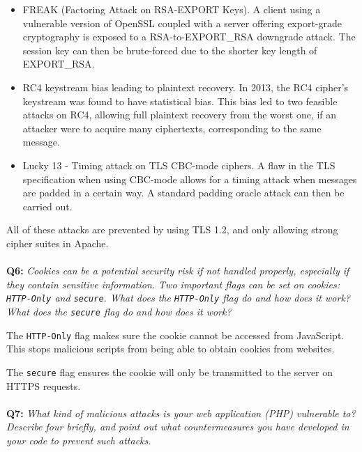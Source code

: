 \begin{itemize}
    \item
        FREAK (Factoring Attack on RSA-EXPORT Keys)\cite{freak-ssl-tls}.
        A client using a vulnerable version of OpenSSL coupled with a server offering export-grade cryptography is exposed to a RSA-to-EXPORT\_RSA downgrade attack.
        The session key can then be brute-forced due to the shorter key length of EXPORT\_RSA.
    \item
        RC4 keystream bias leading to plaintext recovery.
        In 2013, the RC4 cipher's keystream was found to have statistical bias\cite{usenix-rc4}.
        This bias led to two feasible attacks on RC4, allowing full plaintext recovery from the worst one, if an attacker were to acquire many ciphertexts, corresponding to the same message.
    \item
        Lucky 13 - Timing attack on TLS CBC-mode ciphers\cite{lucky-13}.
        A flaw in the TLS specification when using CBC-mode allows for a timing attack when messages are padded in a certain way.
        A standard padding oracle attack can then be carried out.

\end{itemize}

All of these attacks are prevented by using TLS 1.2, and only allowing strong cipher suites in Apache.

\paragraph{}
\textbf{Q6:}
\cprotect\textit{Cookies can be a potential security risk if not handled properly, especially if they contain sensitive information. Two important flags can be set on cookies: \verb/HTTP-Only/ and \verb/secure/. What does the \verb/HTTP-Only/ flag do and how does it work? What does the \verb/secure/ flag do and how does it work?}

The \verb/HTTP-Only/ flag makes sure the cookie cannot be accessed from JavaScript. This stops malicious scripts from being able to obtain cookies from websites.

The \verb/secure/ flag ensures the cookie will only be transmitted to the server on HTTPS requests.

\paragraph{}
\textbf{Q7:}
\textit{What kind of malicious attacks is your web application (PHP) vulnerable to? Describe four briefly, and point out what countermeasures you have developed in your code to prevent such attacks.}

